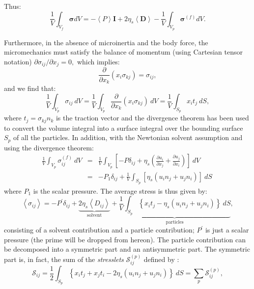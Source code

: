\documentclass[english,fleqn,allpages]{ISTE_science}[2018/07/30]
\begin{document}
Thus: 
\[
\frac{1}{V}\int_{V_{f}}\mathbf{\sigma}dV=-\left\langle P\right\rangle \mathbf{I}+2\eta_{s}\left\langle \mathbf{D}\right\rangle -\frac{1}{V}\int_{V_{p}}\mathbf{\sigma}^{(f)}dV.
\]

Furthermore, in the absence of microinertia and the body force, the
micromechanics must satisfy the balance of momentum (using Cartesian
tensor notation) $\partial\sigma_{ij}/\partial x_{j}=0,$ which implies:
\[
\frac{\partial}{\partial x_{k}}\left(x_{i}\sigma_{kj}\right)=\sigma_{ij},
\]
and we find that: 
\begin{equation}
\frac{1}{V}\int_{V_{p}}\sigma_{ij}\ dV=\frac{1}{V}\int_{V_{p}}\frac{\partial}{\partial x_{k}}\left(x_{i}\sigma_{kj}\right)\ dV=\frac{1}{V}\int_{S_{p}}x_{i}t_{j}\ dS,
\end{equation}
where $t_{j}=\sigma_{kj}n_{k}$ is the traction vector and the divergence
theorem has been used to convert the volume integral into a surface
integral over the bounding surface $S_{p}$ of all the particles.
In addition, with the Newtonian solvent assumption and using the divergence
theorem: 
\begin{eqnarray*}
\frac{1}{V}\int_{V_{p}}\sigma_{ij}^{(f)}~dV & =&\frac{1}{V}\int_{V_{p}}\left[-P\delta_{ij}+\eta_{s}\left(\frac{\partial u_{i}}{\partial x_{j}}+\frac{\partial u_{j}}{\partial x_{i}}\right)\right]\ dV\\
 & =&-P_{1}\delta_{ij}+\frac{1}{V}\int_{S_{p}}\left[\eta_{s}\left(u_{i}n_{j}+u_{j}n_{i}\right)\right]\ dS~
\end{eqnarray*}
where $P_{1}$ is the scalar pressure. The average stress is thus
given by: 
\begin{equation}
\left\langle \sigma_{ij}\right\rangle =-P^{\prime}\delta_{ij}+\underset{\text{solvent}}{\underbrace{2\eta_{s}\left\langle D_{ij}\right\rangle }}+\underset{\text{particles}}{\underbrace{\frac{1}{V}\int_{S_{p}}\left\{ x_{i}t_{j}-\eta_{s}\left(u_{i}n_{j}+u_{j}n_{i}\right)\right\} \ dS}},
\end{equation}
consisting of a solvent contribution and a particle contribution;
$P^{\prime}$ is just a scalar pressure (the prime will be dropped
from hereon). The particle contribution can be decomposed into a symmetric
part and an antisymmetric part. The symmetric part is, in fact, the
sum of the \textit{stresslets} $\mathcal{S}_{ij}^{(p)}$ defined by
\cite{batchelor70}: 
\begin{equation}
\mathcal{S}_{ij}=\frac{1}{2}\int_{S_{p}}\left\{ x_{i}t_{j}+x_{j}t_{i}-2\eta_{s}\left(u_{i}n_{j}+u_{j}n_{i}\right)\right\} \ dS=\sum_{p}\mathcal{S}_{ij}^{(p)},\label{stresslet}
\end{equation}
\end{document}
